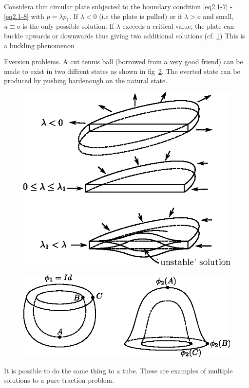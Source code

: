 \begin{example}\label{chap2-exam2.1.4}%
 Consider\pageoriginale a thin circular plate subjected to the
 boundary condition 
  \eqref{eq2.1-7} - \eqref{eq2.1-8} with $p = \lambda p_1$. If
  $\lambda < 0$ (i.e the 
  plate is pulled) or if $\lambda > o$ and small, $u \equiv o$ is the
  only possible solution. If $\lambda$ exceeds a critical value, the
  plate can buckle upwards or downwards thus giving two additional
  solutions (cf. \ref{fig2.1.6}) This is a buckling phenomenon 
\end{example}


\begin{example}\label{chap2-exam2.1.5}%
  Eversion problems. A cut tennis ball (borrowed from a very good
  friend) can be made to exist in two diffrent states as shown in 
fig~\ref{fig2.1.7}. The everted state can be produced by pushing
hard\pageoriginale enough on 
  the natural state. 
\begin{figure}[H]
\centering
\includegraphics{vol71-figures/fig2.1-6.eps}
\medskip
\caption{}\label{fig2.1.6}
\end{figure}

\begin{figure}[H]
\centering
\includegraphics{vol71-figures/fig2.1-7.eps}
\medskip
\caption{}\label{fig2.1.7}
\end{figure}


It is possible to do the same thing to a tube. These are examples of
multiple solutions to a pure traction problem. 
\end{example}


